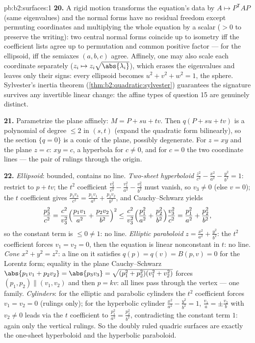 \begin{solution}{pb:b2:surfaces:1}
\textbf{20.} A rigid motion transforms the equation's data by
$A \mapsto P^{\mathsf T}\!AP$ (same eigenvalues) and the
normal forms have no residual freedom except permuting
coordinates and multiplying the whole equation by a scalar
($> 0$ to preserve the writing): two central normal forms
coincide up to isometry iff the coefficient lists agree up to
permutation and common positive factor --- for the ellipsoid,
iff the semiaxes $(a, b, c)$ agree. Affinely, one may also
scale each coordinate separately ($z_i \mapsto z_i\sqrt{\abs
{\lambda_i}}$), which erases the eigenvalues and leaves only
their signs: every ellipsoid becomes $u^2 + v^2 + w^2 = 1$,
the sphere. Sylvester's inertia theorem
(\cref{thm:b2:quadratic:sylvester}) guarantees the signature
survives any invertible linear change: the affine types of
question 15 are genuinely distinct.

\textbf{21.} Parametrize the plane affinely: $M = P + su +
tv$. Then $q(P + su + tv)$ is a polynomial of degree $\leq 2$
in $(s, t)$ (expand the quadratic form bilinearly), so the
section $\{q = 0\}$ is a conic of the plane, possibly
degenerate. For $z = xy$ and the plane $z = c$: $xy = c$, a
hyperbola for $c \neq 0$, and for $c = 0$ the two coordinate
lines --- the pair of rulings through the origin.

\textbf{22.} \emph{Ellipsoid}: bounded, contains no line.
\emph{Two-sheet hyperboloid} $\frac{z^2}{c^2} -
\frac{x^2}{a^2} - \frac{y^2}{b^2} = 1$: restrict to $p + tv$;
the $t^2$ coefficient $\frac{v_3^2}{c^2} - \frac{v_1^2}{a^2}
- \frac{v_2^2}{b^2}$ must vanish, so $v_3 \neq 0$ (else $v =
0$); the $t$ coefficient gives $\frac{p_3v_3}{c^2} =
\frac{p_1v_1}{a^2} + \frac{p_2v_2}{b^2}$, and Cauchy--Schwarz
yields
\[
\frac{p_3^2}{c^2}
= \frac{c^2}{v_3^2}\Bigl(\frac{p_1v_1}{a^2} +
\frac{p_2v_2}{b^2}\Bigr)^2
\leq \frac{c^2}{v_3^2}\Bigl(\frac{p_1^2}{a^2} +
\frac{p_2^2}{b^2}\Bigr)\frac{v_3^2}{c^2}
= \frac{p_1^2}{a^2} + \frac{p_2^2}{b^2},
\]
so the constant term is $\leq 0 \neq 1$: no line.
\emph{Elliptic paraboloid} $z = \frac{x^2}{a^2} +
\frac{y^2}{b^2}$: the $t^2$ coefficient forces $v_1 = v_2 =
0$, then the equation is linear nonconstant in $t$: no line.
\emph{Cone} $x^2 + y^2 = z^2$: a line on it satisfies $q(p) =
q(v) = B(p, v) = 0$ for the Lorentz form; equality in the
plane Cauchy--Schwarz $\abs{p_1v_1 + p_2v_2} = \abs{p_3v_3} =
\sqrt{(p_1^2 + p_2^2)(v_1^2 + v_2^2)}$ forces $(p_1, p_2)
\parallel (v_1, v_2)$ and then $p = kv$: all lines pass
through the vertex --- one family. \emph{Cylinders}: for the
elliptic and parabolic cylinders the $t^2$ coefficient forces
$v_1 = v_2 = 0$ (rulings only); for the hyperbolic cylinder
$\frac{x^2}{a^2} - \frac{y^2}{b^2} = 1$, $\frac{v_1}a = \pm
\frac{v_2}b$ with $v_2 \neq 0$ leads via the $t$ coefficient
to $\frac{p_1^2}{a^2} = \frac{p_2^2}{b^2}$, contradicting the
constant term $1$: again only the vertical rulings. So the
doubly ruled quadric surfaces are exactly the one-sheet
hyperboloid and the hyperbolic paraboloid.


\end{solution}
